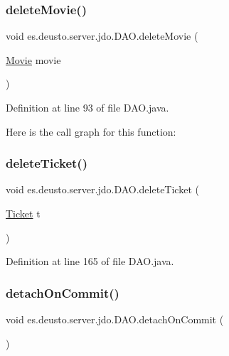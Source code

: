 \subsubsection{\texorpdfstring{deleteMovie()}{deleteMovie()}\hspace{0.1cm}{\footnotesize\ttfamily [2/2]}}
{\footnotesize\ttfamily void es.\+deusto.\+server.\+jdo.\+D\+A\+O.\+delete\+Movie (\begin{DoxyParamCaption}\item[{\mbox{\hyperlink{classes_1_1deusto_1_1server_1_1jdo_1_1_movie}{Movie}}}]{movie }\end{DoxyParamCaption})}



Definition at line 93 of file D\+A\+O.\+java.

Here is the call graph for this function\+:
\mbox{\label{classes_1_1deusto_1_1server_1_1jdo_1_1_d_a_o_a174a90986e95dcae4ab728c8d1a16ca8}} 
\subsubsection{\texorpdfstring{deleteTicket()}{deleteTicket()}}
{\footnotesize\ttfamily void es.\+deusto.\+server.\+jdo.\+D\+A\+O.\+delete\+Ticket (\begin{DoxyParamCaption}\item[{\mbox{\hyperlink{classes_1_1deusto_1_1server_1_1jdo_1_1_ticket}{Ticket}}}]{t }\end{DoxyParamCaption})}



Definition at line 165 of file D\+A\+O.\+java.

\mbox{\label{classes_1_1deusto_1_1server_1_1jdo_1_1_d_a_o_afb5b546d4ade9c2cab1f769e0b0c82bf}} 
\subsubsection{\texorpdfstring{detachOnCommit()}{detachOnCommit()}}
{\footnotesize\ttfamily void es.\+deusto.\+server.\+jdo.\+D\+A\+O.\+detach\+On\+Commit (\begin{DoxyParamCaption}{ }\end{DoxyParamCaption})}



